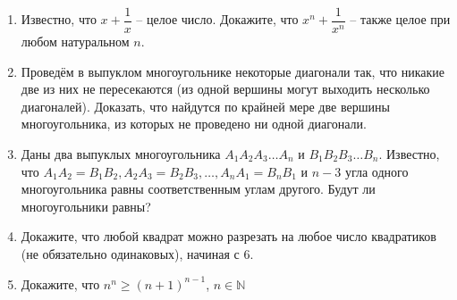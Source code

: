 \documentclass{article}
\begin{document}
\begin{enumerate}[label*=\protect\fbox{\arabic{enumi}}]
\item Известно, что  $x + \dfrac{1}{x}$  – целое число. Докажите, что  $x^n + \dfrac{1}{x^n}$  – также целое при любом натуральном $n$.

\item Проведём в выпуклом многоугольнике некоторые диагонали так, что никакие две из них не пересекаются (из одной вершины могут выходить несколько диагоналей). Доказать, что найдутся по крайней мере две вершины многоугольника, из которых не проведено ни одной диагонали. 

\item Даны два выпуклых многоугольника $A_1A_2A_3\dots A_n$ и $B_1B_2B_3\dots B_n$. Известно, что $A_1A_2 = B_1B_2, A_2A_3 = B_2B_3,\dots, A_nA_1 = B_nB_1$ и $n - 3$ угла одного многоугольника равны соответственным углам другого. Будут ли многоугольники равны?

\item Докажите, что любой квадрат можно разрезать на любое число квадратиков (не обязательно одинаковых), начиная с 6.

%	
%	
%	
%	

\item Докажите, что $n^n \ge (n + 1)^{n - 1}$, $n \in \mathbb{N}$
\end{enumerate}
\end{document}
